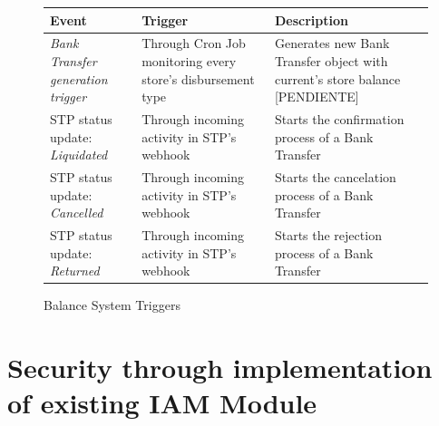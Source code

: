 \begin{figure}[ht]
    \caption{Balance System Triggers}\label{fig:balance_system_triggers}
    \begin{tabularx}{0.9\textwidth} { 
    | >{\centering\arraybackslash}X 
    | >{\centering\arraybackslash}X 
    | >{\raggedright\arraybackslash}X | }
   \hline
   Event & Trigger & Description \\
   \hline
   \textit{Bank Transfer generation trigger} & Through Cron Job monitoring every store's disbursement type & Generates new Bank Transfer object with current's store balance [PENDIENTE]   \\
   \hline
   STP status update: \textit{Liquidated} & Through incoming activity in STP's webhook & Starts the confirmation process of a Bank Transfer   \\
   \hline
   STP status update: \textit{Cancelled} & Through incoming activity in STP's webhook & Starts the cancelation process of a Bank Transfer   \\
   \hline
   STP status update: \textit{Returned} & Through incoming activity in STP's webhook & Starts the rejection process of a Bank Transfer   \\
   \hline
\end{tabularx}
\end{figure}

\section{Security through implementation of existing IAM Module}
